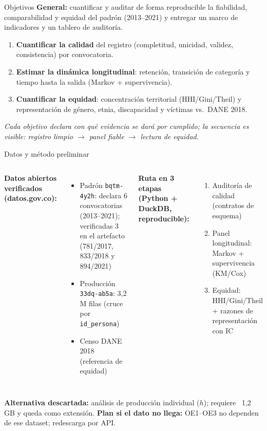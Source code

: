 \documentclass[10pt,aspectratio=169]{beamer}
\begin{document}
\begin{frame}{Objetivos}
\textbf{General:} cuantificar y auditar de forma reproducible la fiabilidad, comparabilidad y equidad del padrón (2013--2021) y entregar un marco de indicadores y un tablero de auditoría.
\begin{enumerate}
  \item \textbf{Cuantificar la calidad} del registro (completitud, unicidad, validez, consistencia) por convocatoria.
  \item \textbf{Estimar la dinámica longitudinal}: retención, transición de categoría y tiempo hasta la salida (Markov + supervivencia).
  \item \textbf{Cuantificar la equidad}: concentración territorial (HHI/Gini/Theil) y representación de género, etnia, discapacidad y víctimas vs.\ DANE 2018.
\end{enumerate}
\emph{Cada objetivo declara con qué evidencia se dará por cumplido; la secuencia es visible: registro limpio $\rightarrow$ panel fiable $\rightarrow$ lectura de equidad.}
\end{frame}

\begin{frame}{Datos y método preliminar}
\begin{columns}[T]
\textbf{Datos abiertos verificados (datos.gov.co):}
\begin{itemize}
  \item Padrón \texttt{bqtm-4y2h}: declara 6 convocatorias (2013--2021); verificadas 3 en el artefacto (781/2017, 833/2018 y 894/2021)
  \item Producción \texttt{33dq-ab5a}: 3,2 M filas (cruce por \texttt{id\_persona})
  \item Censo DANE 2018 (referencia de equidad)
\end{itemize}
\textbf{Ruta en 3 etapas (Python + DuckDB, reproducible):}
\begin{enumerate}
  \item Auditoría de calidad (contratos de esquema)
  \item Panel longitudinal: Markov + supervivencia (KM/Cox)
  \item Equidad: HHI/Gini/Theil + razones de representación con IC
\end{enumerate}
\end{columns}
\vspace{2mm}
\textbf{Alternativa descartada:} análisis de producción individual ($h$); requiere ~1,2\,GB y queda como extensión. \textbf{Plan si el dato no llega:} OE1--OE3 no dependen de ese dataset; redescarga por API.
\end{frame}
\end{document}
